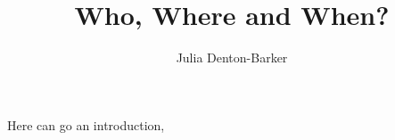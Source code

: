 \documentclass[a4paper]{article}
\title{Who, Where and When?}
\author{Julia Denton-Barker}
\begin{document}
\maketitle
\tableofcontents

Here can go an introduction,


\end{document}
